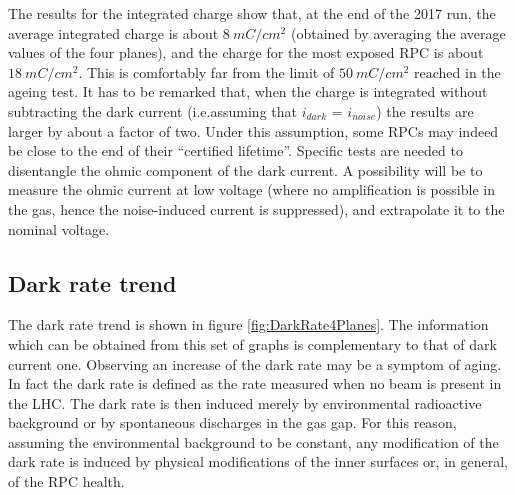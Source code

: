 The results for the integrated charge show that, at the end of the 2017 run, the average integrated charge is about $8\ mC/cm^2$ (obtained by averaging the average values of the four planes), and the charge for the most exposed RPC is about $18\ mC/cm^2$. 
This is comfortably far from the limit of $50\ mC/cm^2$ reached in the ageing test. 
It has to be remarked that, when the charge is integrated without subtracting the dark current (i.e.assuming that $i_{dark}$ = $i_{noise}$) the results are larger by about a factor of two. 
Under this assumption, some RPCs may indeed be close to the end of their “certified lifetime”. 
Specific tests are needed to disentangle the ohmic component of the dark current. 
A possibility will be to measure the ohmic current at low voltage (where no amplification is possible in the gas, hence the noise-induced current is suppressed), and extrapolate it to the nominal voltage.

\subsection{Dark rate trend}
The dark rate trend is shown in figure \ref{fig:DarkRate4Planes}.
The information which can be obtained from this set of graphs is complementary to that of dark current one.
Observing an increase of the dark rate may be a symptom of aging.
In fact the dark rate is defined as the rate measured when no beam is present in the LHC.
The dark rate is then induced merely by environmental radioactive background or by spontaneous discharges in the gas gap.
For this reason, assuming the environmental background to be constant, any modification of the dark rate is induced by physical modifications of the inner surfaces or, in general, of the RPC health.

